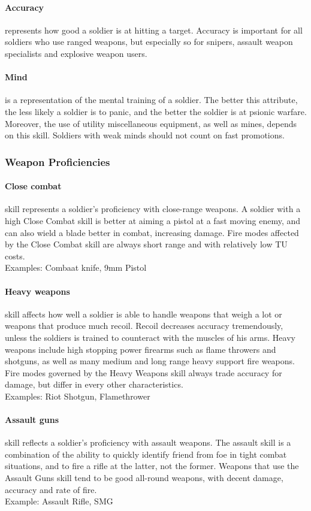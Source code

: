 \paragraph*{Accuracy}
 represents how good a soldier is at hitting a target. Accuracy is important for all soldiers who use ranged weapons, but especially so for snipers, assault weapon specialists and explosive weapon users.
\paragraph*{Mind}
 is a representation of the mental training of a soldier. The better this attribute, the less likely a soldier is to panic, and the better the soldier is at psionic warfare. Moreover, the use of utility miscellaneous equipment, as well as mines, depends on this skill. Soldiers with weak minds should not count on fast promotions.
\subsubsection{Weapon Proficiencies}
\paragraph*{Close combat}
 skill represents a soldier's proficiency with close-range weapons. A soldier with a high Close Combat skill is better at aiming a pistol at a fast moving enemy, and can also wield a blade better in combat, increasing damage. Fire modes affected by the Close Combat skill are always short range and with relatively low TU costs.\\
Examples: Combaat knife, 9mm Pistol
\paragraph*{Heavy weapons}
 skill affects how well a soldier is able to handle weapons that weigh a lot or weapons that produce much recoil. Recoil decreases accuracy tremendously, unless the soldiers is trained to counteract with the muscles of his arms. Heavy weapons include high stopping power firearms such as flame throwers and shotguns, as well as many medium and long range heavy support fire weapons. Fire modes governed by the Heavy Weapons skill always trade accuracy for damage, but differ in every other characteristics.\\
Examples: Riot Shotgun, Flamethrower
\paragraph*{Assault guns}
 skill reflects a soldier's proficiency with assault weapons. The assault skill is a combination of the ability to quickly identify friend from foe in tight combat situations, and to fire a rifle at the latter, not the former. Weapons that use the Assault Guns skill tend to be good all-round weapons, with decent damage, accuracy and rate of fire.\\
Example: Assault Rifle, SMG
